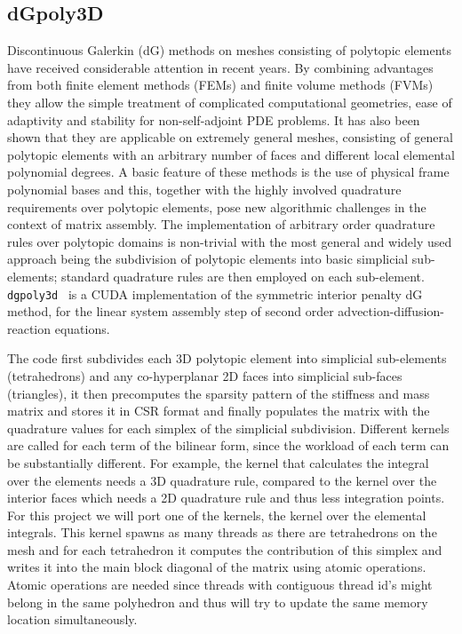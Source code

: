 
\subsection{dGpoly3D}\label{sec:dgpoly3d}

Discontinuous Galerkin (dG) methods on meshes consisting of polytopic elements have received considerable attention in recent years.
By combining advantages from both finite element methods (FEMs) and finite volume methods (FVMs) they allow the simple treatment of complicated computational geometries, ease of adaptivity and stability for non-self-adjoint PDE problems.
It has also been shown that they are applicable on extremely general meshes, consisting of general polytopic elements with an arbitrary number of faces and different local elemental polynomial degrees.
A basic feature of these methods is the use of physical frame polynomial bases and this, together with the highly involved quadrature requirements over polytopic elements, pose new algorithmic challenges in the context of matrix assembly.
The implementation of arbitrary order quadrature rules over polytopic domains is non-trivial with the most general and widely used approach being the subdivision of polytopic elements into basic simplicial sub-elements; standard quadrature rules are then employed on each sub-element.
\texttt{dgpoly3d}~\cite{dong_gpu-accelerated_2021} is a CUDA implementation of the symmetric interior penalty dG method, for the linear system assembly step of second order advection-diffusion-reaction equations.

The code first subdivides each 3D polytopic element into simplicial sub-elements (tetrahedrons) and any co-hyperplanar 2D faces into simplicial sub-faces (triangles), it then precomputes the sparsity pattern of the stiffness and mass matrix and stores it in CSR format and finally populates the matrix with the quadrature values for each simplex of the simplicial subdivision.
Different kernels are called for each term of the bilinear form, since the workload of each term can be substantially different.
For example, the kernel that calculates the integral over the elements needs a 3D quadrature rule, compared to the kernel over the interior faces which needs a 2D quadrature rule and thus less integration points.
For this project we will port one of the kernels, the kernel over the elemental integrals.
This kernel spawns as many threads as there are tetrahedrons on the mesh and for each tetrahedron it computes the contribution of this simplex and writes it into the main block diagonal of the matrix using atomic operations.
Atomic operations are needed since threads with contiguous thread id's might belong in the same polyhedron and thus will try to update the same memory location simultaneously.

